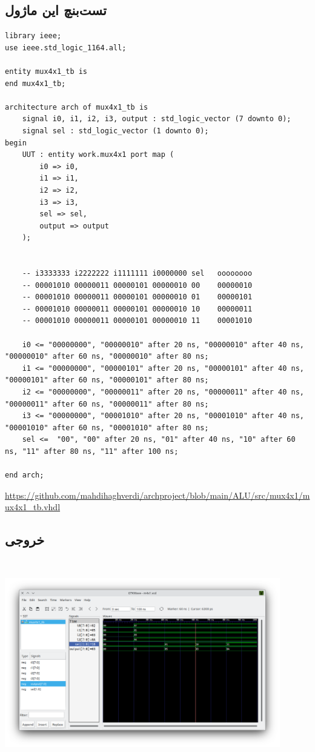 \documentclass[dvipsnames, svgnames, x11names, a4paper, 11pt, oneside]{book}
\begin{document}
				\subsection{تست‌بنچ این ماژول}
					\begin{latin}
						
						\begin{lstlisting}
library ieee;
use ieee.std_logic_1164.all;

entity mux4x1_tb is
end mux4x1_tb;

architecture arch of mux4x1_tb is
	signal i0, i1, i2, i3, output : std_logic_vector (7 downto 0);
	signal sel : std_logic_vector (1 downto 0);
begin
	UUT : entity work.mux4x1 port map (
		i0 => i0,
		i1 => i1,
		i2 => i2,
		i3 => i3,
		sel => sel,
		output => output
	);
	
	
	-- i3333333 i2222222 i1111111 i0000000 sel   oooooooo
	-- 00001010 00000011 00000101 00000010 00    00000010
	-- 00001010 00000011 00000101 00000010 01    00000101
	-- 00001010 00000011 00000101 00000010 10    00000011
	-- 00001010 00000011 00000101 00000010 11    00001010
	
	i0 <= "00000000", "00000010" after 20 ns, "00000010" after 40 ns, "00000010" after 60 ns, "00000010" after 80 ns;
	i1 <= "00000000", "00000101" after 20 ns, "00000101" after 40 ns, "00000101" after 60 ns, "00000101" after 80 ns;
	i2 <= "00000000", "00000011" after 20 ns, "00000011" after 40 ns, "00000011" after 60 ns, "00000011" after 80 ns;
	i3 <= "00000000", "00001010" after 20 ns, "00001010" after 40 ns, "00001010" after 60 ns, "00001010" after 80 ns;
	sel <=  "00", "00" after 20 ns, "01" after 40 ns, "10" after 60 ns, "11" after 80 ns, "11" after 100 ns;

end arch;
						\end{lstlisting}
						\url{https://github.com/mahdihaghverdi/archproject/blob/main/ALU/src/mux4x1/mux4x1_tb.vhdl}
					\end{latin}
				
				\subsection{خروجی }
					\begin{center}
						\includegraphics[width=12cm, height=9cm]{./images/mux_vcd}
					\end{center}
		\clearpage
\end{document}
